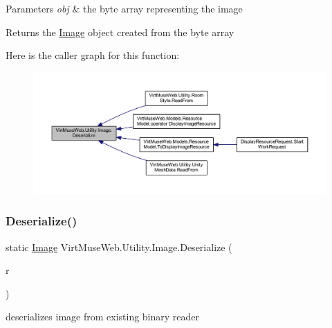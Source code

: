 \begin{DoxyParams}{Parameters}
{\em obj} & the byte array representing the image\\
\hline
\end{DoxyParams}
\begin{DoxyReturn}{Returns}
the \mbox{\hyperlink{class_virt_muse_web_1_1_utility_1_1_image}{Image}} object created from the byte array
\end{DoxyReturn}
Here is the caller graph for this function\+:
\nopagebreak
\begin{figure}[H]
\begin{center}
\leavevmode
\includegraphics[width=350pt]{class_virt_muse_web_1_1_utility_1_1_image_ab45d281959b7e4d99408631f57f1d372_icgraph}
\end{center}
\end{figure}
\mbox{\label{class_virt_muse_web_1_1_utility_1_1_image_a0d1b4f954a69ba6cd90639d0d605a814}} 
\subsubsection{\texorpdfstring{Deserialize()}{Deserialize()}\hspace{0.1cm}{\footnotesize\ttfamily [2/2]}}
{\footnotesize\ttfamily static \mbox{\hyperlink{class_virt_muse_web_1_1_utility_1_1_image}{Image}} Virt\+Muse\+Web.\+Utility.\+Image.\+Deserialize (\begin{DoxyParamCaption}\item[{Binary\+Reader}]{r }\end{DoxyParamCaption})\hspace{0.3cm}{\ttfamily [static]}}



deserializes image from existing binary reader 


